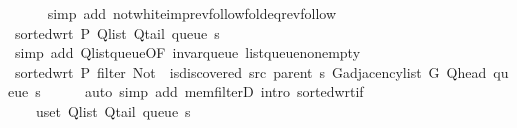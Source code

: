 \begin{isabellebody}
\ \ \ \ \isamarkupfalse%
\ {\isacharparenleft}{\kern0pt}simp\ add{\isacharcolon}{\kern0pt}\ not{\isacharunderscore}{\kern0pt}white{\isacharunderscore}{\kern0pt}imp{\isacharunderscore}{\kern0pt}rev{\isacharunderscore}{\kern0pt}follow{\isacharunderscore}{\kern0pt}fold{\isacharunderscore}{\kern0pt}eq{\isacharunderscore}{\kern0pt}rev{\isacharunderscore}{\kern0pt}follow{\isacharparenright}{\kern0pt}\isanewline
\ \ \isamarkupfalse%
\ {\isachardoublequoteopen}sorted{\isacharunderscore}{\kern0pt}wrt\ {\isacharquery}{\kern0pt}P\ {\isacharparenleft}{\kern0pt}Q{\isacharunderscore}{\kern0pt}list\ {\isacharparenleft}{\kern0pt}Q{\isacharunderscore}{\kern0pt}tail\ {\isacharparenleft}{\kern0pt}queue\ s{\isacharparenright}{\kern0pt}{\isacharparenright}{\kern0pt}{\isacharparenright}{\kern0pt}{\isachardoublequoteclose}\isanewline
\ \ \ \ \isamarkupfalse%
\ {\isacharparenleft}{\kern0pt}simp\ add{\isacharcolon}{\kern0pt}\ Q{\isachardot}{\kern0pt}list{\isacharunderscore}{\kern0pt}queue{\isacharbrackleft}{\kern0pt}OF\ invar{\isacharunderscore}{\kern0pt}queue\ list{\isacharunderscore}{\kern0pt}queue{\isacharunderscore}{\kern0pt}non{\isacharunderscore}{\kern0pt}empty{\isacharbrackright}{\kern0pt}{\isacharparenright}{\kern0pt}\isanewline
\ \ \isamarkupfalse%
\ \isamarkupfalse%
\ {\isachardoublequoteopen}sorted{\isacharunderscore}{\kern0pt}wrt\ {\isacharquery}{\kern0pt}P\ {\isacharparenleft}{\kern0pt}filter\ {\isacharparenleft}{\kern0pt}Not\ {\isasymcirc}\ is{\isacharunderscore}{\kern0pt}discovered\ src\ {\isacharparenleft}{\kern0pt}parent\ s{\isacharparenright}{\kern0pt}{\isacharparenright}{\kern0pt}\ {\isacharparenleft}{\kern0pt}G{\isachardot}{\kern0pt}adjacency{\isacharunderscore}{\kern0pt}list\ G\ {\isacharparenleft}{\kern0pt}Q{\isacharunderscore}{\kern0pt}head\ {\isacharparenleft}{\kern0pt}queue\ s{\isacharparenright}{\kern0pt}{\isacharparenright}{\kern0pt}{\isacharparenright}{\kern0pt}{\isacharparenright}{\kern0pt}{\isachardoublequoteclose}\isanewline
\ \ \ \ \isamarkupfalse%
\ {\isacharparenleft}{\kern0pt}auto\ simp\ add{\isacharcolon}{\kern0pt}\ mem{\isacharunderscore}{\kern0pt}filterD{\isacharparenleft}{\kern0pt}{}{\isacharparenright}{\kern0pt}\ intro{\isacharcolon}{\kern0pt}\ sorted{\isacharunderscore}{\kern0pt}wrt{\isacharunderscore}{\kern0pt}if{\isacharparenright}{\kern0pt}\isanewline
\ \ \isamarkupfalse%
\ \isamarkupfalse%
\isanewline
\ \ \ \ {\isachardoublequoteopen}{\isasymforall}u{\isasymin}set\ {\isacharparenleft}{\kern0pt}Q{\isacharunderscore}{\kern0pt}list\ {\isacharparenleft}{\kern0pt}Q{\isacharunderscore}{\kern0pt}tail\ {\isacharparenleft}{\kern0pt}queue\ s{\isacharparenright}{\kern0pt}{\isacharparenright}{\kern0pt}{\isacharparenright}{\kern0pt}{\isachardot}{\kern0pt}\isanewline

\end{isabellebody}
